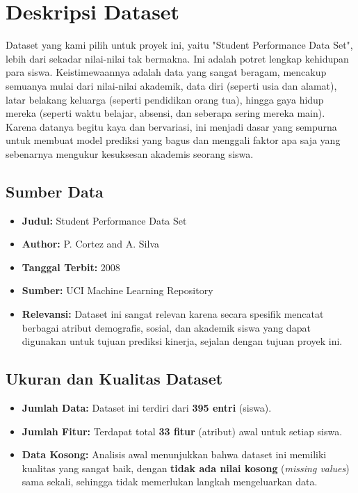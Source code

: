 \section{Deskripsi Dataset}
Dataset yang kami pilih untuk proyek ini, yaitu "Student Performance Data Set", lebih dari sekadar nilai-nilai tak bermakna. Ini adalah potret lengkap kehidupan para siswa. Keistimewaannya adalah data yang sangat beragam, mencakup semuanya mulai dari nilai-nilai akademik, data diri (seperti usia dan alamat), latar belakang keluarga (seperti pendidikan orang tua), hingga gaya hidup mereka (seperti waktu belajar, absensi, dan seberapa sering mereka main). Karena datanya begitu kaya dan bervariasi, ini menjadi dasar yang sempurna untuk membuat model prediksi yang bagus dan menggali faktor apa saja yang sebenarnya mengukur kesuksesan akademis seorang siswa.

\subsection{Sumber Data}
\begin{itemize}
    \item \textbf{Judul:} Student Performance Data Set
    \item \textbf{Author:} P. Cortez and A. Silva
    \item \textbf{Tanggal Terbit:} 2008
    \item \textbf{Sumber:} UCI Machine Learning Repository
    \item \textbf{Relevansi:} Dataset ini sangat relevan karena secara spesifik mencatat berbagai atribut demografis, sosial, dan akademik siswa yang dapat digunakan untuk tujuan prediksi kinerja, sejalan dengan tujuan proyek ini.
\end{itemize}

\subsection{Ukuran dan Kualitas Dataset}
\begin{itemize}
    \item \textbf{Jumlah Data:} Dataset ini terdiri dari \textbf{395 entri} (siswa).
    \item \textbf{Jumlah Fitur:} Terdapat total \textbf{33 fitur} (atribut) awal untuk setiap siswa.
    \item \textbf{Data Kosong:} Analisis awal menunjukkan bahwa dataset ini memiliki kualitas yang sangat baik, dengan \textbf{tidak ada nilai kosong} (\textit{missing values}) sama sekali, sehingga tidak memerlukan langkah mengeluarkan data.
\end{itemize}

